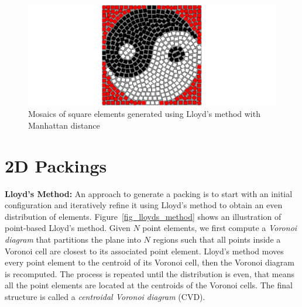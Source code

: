 \begin{figure}
\centering
\includegraphics[width=1.0\textwidth]{figures/related/hausner.pdf} 
\caption[Decorative mosaics using Lloyd's method]
{\label{fig_related_hausner} 
\newtext
{
Mosaics of square elements generated using Lloyd's method with Manhattan distance~\cite{Hausner2001}
}
}
\end{figure}





\section{2D Packings}


\newtext
{
\textbf{Lloyd's Method:}
An approach to generate a packing is to start with an initial configuration and iteratively refine it using Lloyd's method
to obtain an even distribution of elements. 
Figure~\ref{fig_lloyds_method} shows an illustration of point-based Lloyd's method.
Given $N$ point elements, 
we first compute a \textit{Voronoi diagram} that partitions the plane into $N$ regions such that
all points inside a Voronoi cell are closest to its associated point element.
Lloyd's method moves every point element to the centroid of its Voronoi cell, 
then the Voronoi diagram is recomputed.
The process is repeated until the distribution is even,
that means all the point elements are located at the centroids of the Voronoi cells.
The final structure is called a \textit{centroidal Voronoi diagram} (CVD).
}

